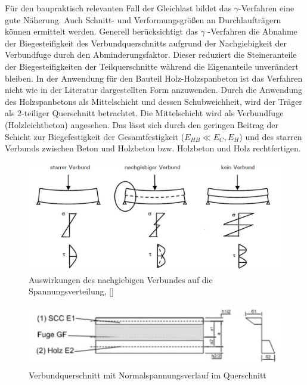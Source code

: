 Für den baupraktisch relevanten Fall der Gleichlast bildet das 
 $\gamma$-Verfahren eine gute
Näherung. Auch Schnitt- und Verformungsgrößen an Durchlaufträgern können ermittelt
werden. Generell berücksichtigt das 
$\gamma$ -Verfahren die Abnahme der Biegesteifigkeit
des Verbundquerschnitts aufgrund der Nachgiebigkeit der Verbundfuge durch den Abminderungsfaktor. Dieser reduziert die Steineranteile der Biegesteifigkeiten der
Teilquerschnitte während die Eigenanteile unverändert bleiben. In der Anwendung für
den Bauteil Holz-Holzspanbeton ist das Verfahren nicht wie in der Literatur dargestellten
Form anzuwenden. Durch die Anwendung des Holzspanbetons als Mittelschicht und dessen Schubweichheit, wird der Träger als 2-teiliger Querschnitt betrachtet. Die Mittelschicht wird als Verbundfuge (Holzleichtbeton) angesehen. Das lässt sich durch den geringen Beitrag der Schicht zur Biegefestigkeit der Gesamtfestigkeit ($E_{HB}\ll E_{C},E_{H}$) und des starren Verbunds zwischen Beton und Holzbeton bzw. Holzbeton und Holz rechtfertigen.



\begin{figure}[h!]
\begin{center}
\includegraphics[scale =0.5]{gammaverfahren/abbildungen/verbunddarstellung.jpg}
\caption{Auswirkungen des nachgiebigen Verbundes auf die Spannungsverteilung, []}
\label{verbunddarstellung}
\end{center}
\end{figure}



\begin{figure}[h!]
\begin{center}
\includegraphics[scale =0.8]{gammaverfahren/abbildungen/verbundquerschnitt.JPG}
\caption{Verbundquerschnitt mit Normalspannungsverlauf im Querschnitt}
\label{verbundquerschnitt}
\end{center}
\end{figure}



